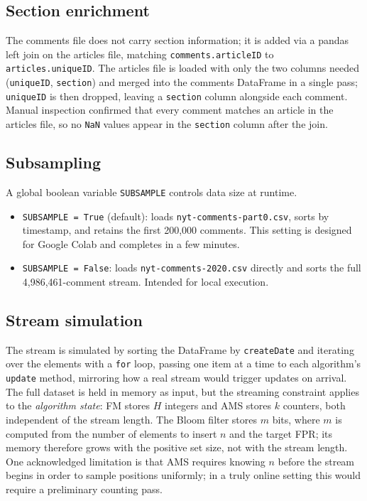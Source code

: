 \documentclass[11pt,a4paper]{article}
\begin{document}
\subsection*{Section enrichment}
The comments file does not carry section information; it is added via a pandas
left join on the articles file, matching \texttt{comments.articleID} to
\texttt{articles.uniqueID}.
The articles file is loaded with only the two columns needed (\texttt{uniqueID},
\texttt{section}) and merged into the comments DataFrame in a single pass;
\texttt{uniqueID} is then dropped, leaving a \texttt{section} column alongside
each comment.
Manual inspection confirmed that every comment matches an article in the articles
file, so no \texttt{NaN} values appear in the \texttt{section} column after the join.

\subsection*{Subsampling}
A global boolean variable \texttt{SUBSAMPLE} controls data size at runtime.
\begin{itemize}
  \item \texttt{SUBSAMPLE = True} (default): loads \texttt{nyt-comments-part0.csv},
        sorts by timestamp, and retains the first 200,000 comments. This setting
        is designed for Google Colab and completes
        in a few minutes.
  \item \texttt{SUBSAMPLE = False}: loads \texttt{nyt-comments-2020.csv} directly and
        sorts the full 4,986,461-comment stream. Intended for local execution.
\end{itemize}

\subsection*{Stream simulation}
The stream is simulated by sorting the DataFrame by \texttt{createDate} and
iterating over the elements with a \texttt{for} loop, passing one item at a time
to each algorithm's \texttt{update} method, mirroring how a real stream would
trigger updates on arrival.
The full dataset is held in memory as input, but the streaming constraint applies
to the \emph{algorithm state}: FM stores $H$ integers and AMS stores $k$ counters,
both independent of the stream length.
The Bloom filter stores $m$ bits, where $m$ is computed from the number of elements
to insert $n$ and the target FPR; its memory therefore grows with the positive set
size, not with the stream length.
One acknowledged limitation is that AMS requires knowing $n$ before the stream
begins in order to sample positions uniformly; in a truly online setting this
would require a preliminary counting pass.
\end{document}

